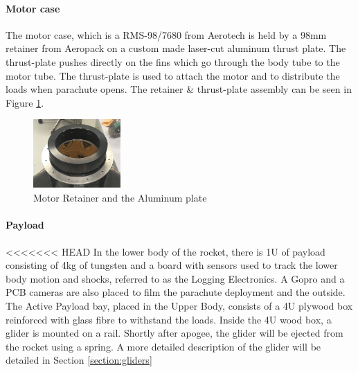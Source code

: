 \paragraph{Motor case}
\hfill \break
The motor case, which is a RMS-98/7680 from Aerotech is held by a 98mm retainer from Aeropack on a custom made laser-cut aluminum thrust plate. The thrust-plate pushes directly on the fins which go through the body tube to the motor tube. The thrust-plate is used to attach the motor and to distribute the loads when parachute opens.
 The retainer \& thrust-plate assembly can be seen in Figure \ref{f:motor_retainer_2}.
\begin{figure}[h!]
        \centering
        \includegraphics[width=0.3\textwidth]{img/motor_retainer.png}
        \caption{Motor Retainer and the Aluminum plate}
        \label{f:motor_retainer_2}
    \end{figure}


\paragraph{Payload}
\hfill \break
<<<<<<< HEAD
In the lower body of the rocket, there is 1U of payload 
consisting of 4kg of tungsten and a board with sensors used to track the lower body motion and shocks, referred to as the Logging Electronics. A Gopro and a PCB cameras are also placed to film the parachute deployment and the outside.
The Active Payload bay, placed in the Upper Body, consists of a 4U plywood box reinforced with glass fibre to withstand the loads. Inside the 4U wood box, a glider is mounted on a rail. Shortly after apogee, the glider will be ejected from the rocket using a spring. A more detailed description of the glider will be detailed in Section \ref{section:gliders}




